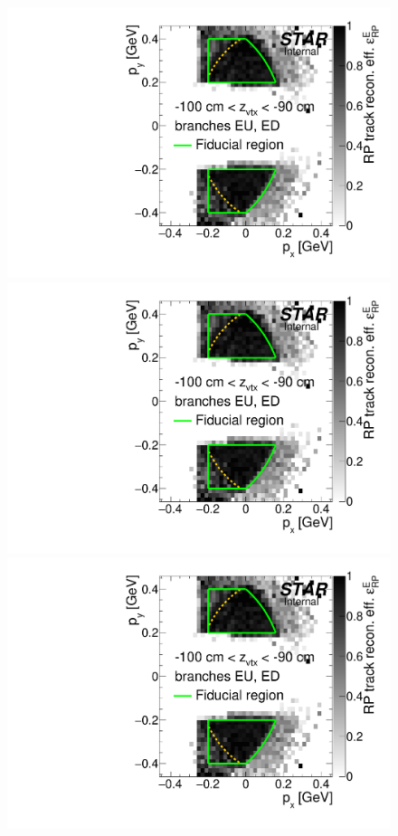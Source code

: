 \begin{figure}[hb]
{}~
\parbox{0.495\textwidth}{
  \centering
  \includegraphics[width=\linewidth,page=10]{graphics/corrections/mcEffPxPy.pdf}\\
  \includegraphics[width=\linewidth,page=12]{graphics/corrections/mcEffPxPy.pdf}\\
  \includegraphics[width=\linewidth,page=14]{graphics/corrections/mcEffPxPy.pdf}
}%
\end{figure}
